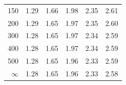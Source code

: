 \begin{center}
\begin{tabular}{r | rrr rr}
\hline
150  &  {\normalsize  1.29} & {\normalsize  1.66} & {\normalsize  1.98} & {\normalsize  2.35} & {\normalsize  2.61}  \\ 
200  &  {\normalsize  1.29} & {\normalsize  1.65} & {\normalsize  1.97} & {\normalsize  2.35} & {\normalsize  2.60}  \\ 
300  &  {\normalsize  1.28} & {\normalsize  1.65} & {\normalsize  1.97} & {\normalsize  2.34} & {\normalsize  2.59}  \\ 
400  &  {\normalsize  1.28} & {\normalsize  1.65} & {\normalsize  1.97} & {\normalsize  2.34} & {\normalsize  2.59}  \\ 
500  &  {\normalsize  1.28} & {\normalsize  1.65} & {\normalsize  1.96} & {\normalsize  2.33} & {\normalsize  2.59}  \\ 
\hline
\hline
$\infty$  &  {\normalsize  1.28} & {\normalsize  1.65} & {\normalsize  1.96} & {\normalsize  2.33} & {\normalsize  2.58}  \\ 
\hline
\end{tabular}
\end{center}

